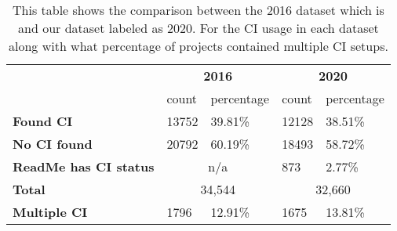 \begin{table}[!ht]
    \begin{tabular}{l|l|l|l|l|}
    \cline{2-5}
                                                & \multicolumn{2}{c|}{\textbf{2016}} & \multicolumn{2}{c|}{\textbf{2020}} \\ \cline{2-5} 
                                                & count         & percentage         & count         & percentage         \\ \hline
    \multicolumn{1}{|l|}{\textbf{Found CI}}          & 13752         & 39.81\%            & 12128         & 38.51\%            \\ \hline
    \multicolumn{1}{|l|}{\textbf{No CI found}}       & 20792         & 60.19\%            & 18493         & 58.72\%            \\ \hline
    \multicolumn{1}{|l|}{\textbf{ReadMe has CI status}}      & \multicolumn{2}{c|}{n/a}           & 873           & 2.77\%             \\ \hline
    \multicolumn{1}{|l|}{\textbf{Total}}      & \multicolumn{2}{c|}{34,544}           & \multicolumn{2}{c|}{32,660}             \\ \hline
    \multicolumn{1}{|l|}{\textbf{Multiple CI}} & 1796          & 12.91\%            & 1675          & 13.81\%            \\ \hline

    \end{tabular}
    \label{table:comparison_dataset}

    \caption{This table shows the comparison between the 2016 dataset which is\citet{Hilton2016} and our dataset labeled as 2020. For the CI usage in each dataset along with what percentage of projects contained multiple CI setups.}
\end{table}